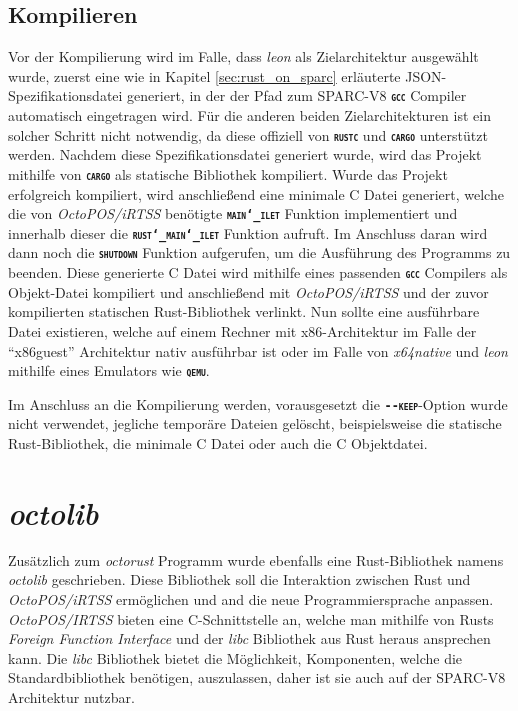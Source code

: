 \subsection{Kompilieren}

Vor der Kompilierung wird im Falle, dass \textit{leon} als Zielarchitektur ausgewählt wurde,
zuerst eine wie in Kapitel \ref{sec:rust_on_sparc} erläuterte
JSON-Spezifikationsdatei generiert,
in der der Pfad zum SPARC-V8 \texttt{\textsc{\textbf{gcc}}} Compiler automatisch eingetragen wird.
Für die anderen beiden Zielarchitekturen ist ein solcher Schritt nicht notwendig,
da diese offiziell von \texttt{\textsc{\textbf{rustc}}} und \texttt{\textsc{\textbf{cargo}}} unterstützt werden. 
Nachdem diese Spezifikationsdatei generiert wurde, wird das Projekt mithilfe von \texttt{\textsc{\textbf{cargo}}}
als statische Bibliothek kompiliert.
Wurde das Projekt erfolgreich kompiliert, wird anschließend eine minimale C Datei generiert,
welche die von \textit{OctoPOS/iRTSS} benötigte \texttt{\textsc{\textbf{main\char`_ilet}}} Funktion implementiert
und innerhalb dieser die \texttt{\textsc{\textbf{rust\char`_main\char`_ilet}}} Funktion aufruft.
Im Anschluss daran wird dann noch die \texttt{\textsc{\textbf{shutdown}}} Funktion aufgerufen, um die 
Ausführung des Programms zu beenden. Diese generierte C Datei wird mithilfe eines passenden
\texttt{\textsc{\textbf{gcc}}} Compilers als Objekt-Datei kompiliert
und anschließend mit \textit{OctoPOS/iRTSS} und der zuvor kompilierten statischen Rust-Bibliothek verlinkt.
Nun sollte eine ausführbare Datei existieren, welche auf einem Rechner mit x86-Architektur im Falle der "`x86guest"' 
Architektur nativ ausführbar ist oder im Falle von \textit{x64native} und \textit{leon} mithilfe eines Emulators wie 
\texttt{\textsc{\textbf{qemu}}}.

Im Anschluss an die Kompilierung werden,
vorausgesetzt die \texttt{\textsc{\textbf{-{}-keep}}}-Option wurde nicht verwendet,
jegliche temporäre Dateien gelöscht, beispielsweise die statische Rust-Bibliothek,
die minimale C Datei oder auch die C Objektdatei.

\section{\textit{octolib}}\label{sec:octolib}

Zusätzlich zum \textit{octorust} Programm wurde ebenfalls eine Rust-Bibliothek namens \textit{octolib} geschrieben. 
Diese Bibliothek soll die Interaktion zwischen Rust und \textit{OctoPOS/iRTSS} ermöglichen und and die neue 
Programmiersprache anpassen. \textit{OctoPOS/IRTSS} bieten eine C-Schnittstelle an, welche man mithilfe von Rusts
\textit{Foreign Function Interface} und der \textit{libc} Bibliothek aus Rust heraus ansprechen kann.
Die \textit{libc} Bibliothek bietet die Möglichkeit, Komponenten, welche die Standardbibliothek benötigen, 
auszulassen, daher ist sie auch auf der SPARC-V8 Architektur nutzbar.

